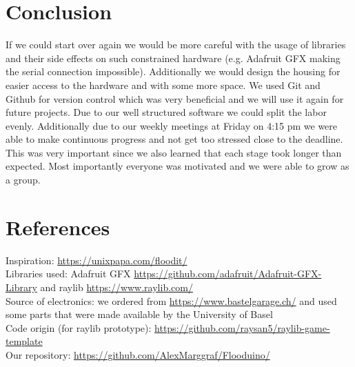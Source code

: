 \documentclass[10pt, a4paper]{article}
\begin{document}
\section*{Conclusion}

If we could start over again we would be more careful with the usage of libraries and their side effects on such constrained hardware (e.g. Adafruit GFX making the serial connection impossible). 
Additionally we would design the housing for easier access to the hardware and with some more space. We used Git and Github for version control which was very beneficial and we will use it again for future projects. Due to our well structured software we could split the labor evenly. Additionally due to our weekly meetings at Friday on 4:15 pm we were able to make continuous progress and not get too stressed close to the deadline. This was very important since we also learned that each stage took longer than expected. 
Most importantly everyone was motivated and we were able to grow as a group. 


\section*{References}
Inspiration: \url{https://unixpapa.com/floodit/} \\
Libraries used: Adafruit GFX \url{https://github.com/adafruit/Adafruit-GFX-Library} and raylib \url{https://www.raylib.com/} \\
Source of electronics: we ordered from \url{https://www.bastelgarage.ch/} and used some parts that were made available by the University of Basel \\
Code origin (for raylib prototype): \url{https://github.com/raysan5/raylib-game-template}\\
Our repository: \url{https://github.com/AlexMarggraf/Flooduino/}
\end{document}
